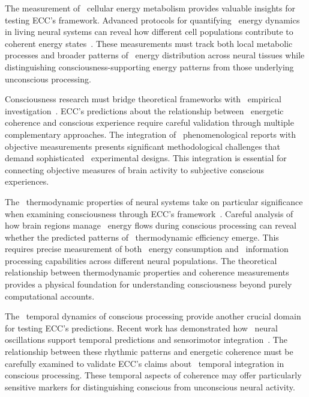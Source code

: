 The measurement of~ cellular energy metabolism provides valuable insights for testing ECC's framework. Advanced protocols for quantifying~ energy dynamics in living neural systems can reveal how different cell populations contribute to~ coherent energy states~\cite{Zhang2019}. These measurements must track both local metabolic processes and broader patterns of~ energy distribution across neural tissues while distinguishing consciousness-supporting energy patterns from those underlying unconscious processing.

 Consciousness research must bridge theoretical frameworks with~ empirical investigation~\cite{Tononi2015, da2024mathematical}. ECC's predictions about the relationship between~ energetic coherence and conscious experience require careful validation through multiple complementary approaches. The integration of~ phenomenological reports with objective measurements presents significant methodological challenges that demand sophisticated~ experimental designs. This integration is essential for connecting objective measures of brain activity to subjective conscious experiences.

The~ thermodynamic properties of neural systems take on particular significance when examining consciousness through ECC's framework~\cite{bejan2011constructal, juarrero2023context}. Careful analysis of how brain regions manage~ energy flows during conscious processing can reveal whether the predicted patterns of~ thermodynamic efficiency emerge. This requires precise measurement of both~ energy consumption and~ information processing capabilities across different neural populations. The theoretical relationship between thermodynamic properties and coherence measurements provides a physical foundation for understanding consciousness beyond purely computational accounts.

The~ temporal dynamics of conscious processing provide another crucial domain for testing ECC's predictions. Recent work has demonstrated how~ neural oscillations support temporal predictions and sensorimotor integration~\cite{Palva2018, van2025processes}. The relationship between these rhythmic patterns and energetic coherence must be carefully examined to validate ECC's claims about~ temporal integration in conscious processing. These temporal aspects of coherence may offer particularly sensitive markers for distinguishing conscious from unconscious neural activity.

